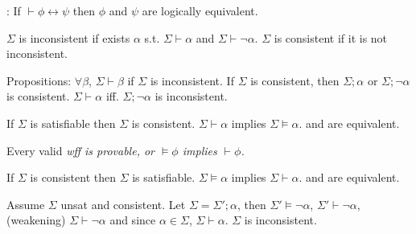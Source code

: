 \documentclass{article}
\newcommand \Corollary[1]			{\noindent \bt{\uuline{Corollary} #1}: }
\begin{document}
\Corollary {}
	If $\vdash \phi \leftrightarrow \psi$ then $\phi$ and $\psi$ are logically equivalent.
	
	$\Sigma$ is inconsistent if exists $\alpha$ s.t. $\Sigma \vdash \alpha$ and $\Sigma \vdash \neg\alpha$. $\Sigma$ is consistent if it is not inconsistent. 
	
	Propositions:  $\forall \beta$, $\Sigma \vdash \beta$ if $\Sigma$ is inconsistent.  If $\Sigma$ is consistent, then $\Sigma; \alpha$ or $\Sigma; \neg\alpha$ is consistent.  $\Sigma \vdash \alpha$ iff. $\Sigma; \neg\alpha$ is inconsistent.
	
	 If $\Sigma$ is satisfiable then $\Sigma$ is consistent.  $\Sigma \vdash \alpha$ implies $\Sigma \vDash \alpha$.  and  are equivalent.
	
	Every valid \it{wff} is provable, or $\vDash \phi$ implies $\vdash \phi$.
	
	 If $\Sigma$ is consistent then $\Sigma$ is satisfiable.  $\Sigma \vDash \alpha$ implies $\Sigma \vdash \alpha$.  and  are equivalent.
	
\Proof
	 Assume $\Sigma$ unsat and consistent. Let $\Sigma=\Sigma';\alpha$, then $\Sigma'\vDash \neg\alpha$, $\Sigma'\vdash \neg\alpha$, (weakening) $\Sigma \vdash \neg\alpha$ and since $\alpha \in \Sigma$, $\Sigma \vdash \alpha$. $\Sigma$ is inconsistent.
	
\end{document}
